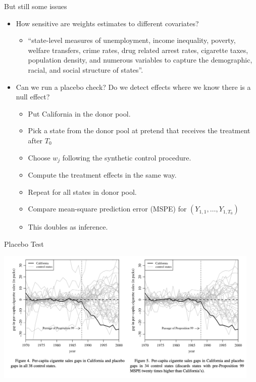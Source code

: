 \documentclass[xcolor=pdftex,dvipsnames,table,mathserif,aspectratio=169]{beamer}
\begin{document}
\begin{frame}{But still some issues}
\begin{itemize}
\item How sensitive are weights estimates to different covariates?
\begin{itemize}
\item ``state-level measures of unemployment, income inequality, poverty, welfare transfers, crime rates, drug related arrest rates, cigarette taxes, population density, and numerous variables to capture the demographic, racial, and social structure of states''.
\end{itemize}
\item Can we run a \alert{placebo check}? Do we detect effects where we know there is a null effect?
\begin{itemize}
\item Put California in the donor pool.
\item Pick a state from the donor pool at pretend that receives the treatment after $T_0$
\item Choose $w_j$ following the synthetic control procedure.
\item Compute the treatment effects in the same way.
\item Repeat for all states in donor pool.
\item Compare \alert{mean-square prediction error} (MSPE) for $(Y_{1,1},\ldots,Y_{1,T_0})$
\item This doubles as \alert{inference}.
\end{itemize}
\end{itemize}
\end{frame}



\begin{frame}{Placebo Test}
\begin{center}
\includegraphics[width=5in]{./resources/abadie_5.png}
\end{center}
\end{frame}
\end{document}
